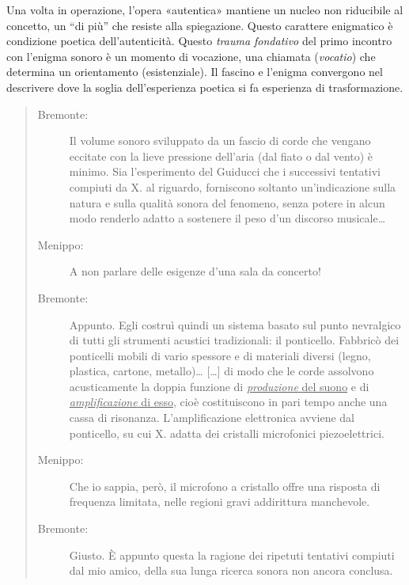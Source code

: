 Una volta in operazione, l'opera «autentica» mantiene un nucleo non riducibile
al concetto, un “di più” che resiste alla spiegazione. Questo carattere
enigmatico è condizione poetica dell'autenticità.
Questo \emph{trauma fondativo} del primo incontro con l'enigma sonoro è un momento di
vocazione, una chiamata (\emph{vocatio}) che determina un orientamento
(esistenziale). Il fascino \cite{blanchot82} e l'enigma \cite{adorno1970} convergono
nel descrivere dove la soglia dell'esperienza poetica si fa esperienza di
trasformazione.


\begin{quote}
  \begin{sf}
    \small
    \begin{description}
      \item[Bremonte:] Il volume sonoro sviluppato da un fascio di corde che
      vengano eccitate con la lieve pressione dell’aria (dal fiato o dal vento)
      è minimo. Sia l’esperimento del Guiducci che i successivi tentativi
      compiuti da X. al riguardo, forniscono soltanto un’indicazione sulla
      natura e sulla qualità sonora del fenomeno, senza potere in alcun modo
      renderlo adatto a sostenere il peso d’un discorso musicale\ldots
      \item[Menippo:] A non parlare delle esigenze d’una sala da concerto!
      \item[Bremonte:] Appunto. Egli costruì quindi un sistema basato sul punto
      nevralgico di tutti gli strumenti acustici tradizionali: il ponticello.
      Fabbricò dei ponticelli mobili di vario spessore e di materiali diversi
      (legno, plastica, cartone, metallo)\ldots
      [\ldots] di modo che le corde assolvono acusticamente la doppia funzione
      di \underline{\emph{produzione} del suono} e di \underline{\emph{amplificazione} di esso}, cioè costituiscono in
      pari tempo anche una cassa di risonanza. L’amplificazione elettronica
      avviene dal ponticello, su cui X. adatta dei cristalli microfonici
      piezoelettrici.
      \item[Menippo:] Che io sappia, però, il microfono a cristallo offre una
      risposta di frequenza limitata, nelle regioni gravi addirittura manchevole.
      \item[Bremonte:] Giusto. È appunto questa la ragione dei ripetuti
      tentativi compiuti dal mio amico, della sua lunga ricerca sonora non
      ancora conclusa.
    \end{description}
  \end{sf}
\end{quote}

